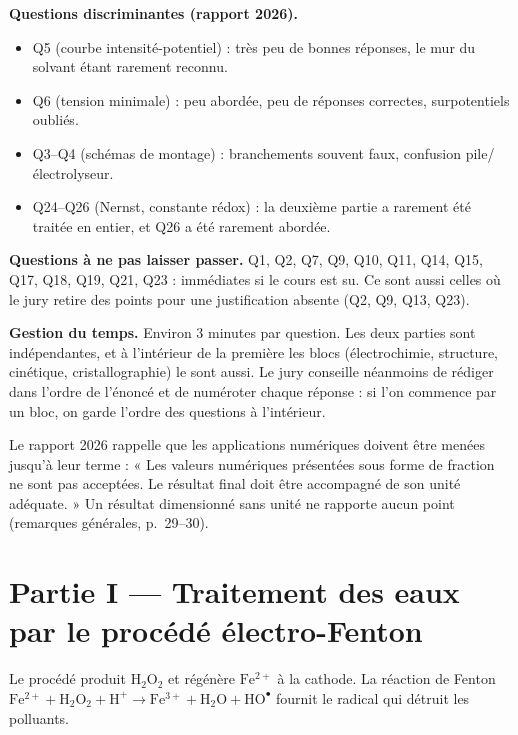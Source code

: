\documentclass[11pt,a4paper]{article}
\providecommand{\tightlist}{\setlength{\itemsep}{0pt}\setlength{\parskip}{0pt}}
\begin{document}
\textbf{Questions discriminantes (rapport 2026).}

\begin{itemize}
\tightlist
\item
  Q5 (courbe intensité-potentiel) : très peu de bonnes réponses, le mur du solvant étant rarement reconnu.
\item
  Q6 (tension minimale) : peu abordée, peu de réponses correctes, surpotentiels oubliés.
\item
  Q3--Q4 (schémas de montage) : branchements souvent faux, confusion pile/électrolyseur.
\item
  Q24--Q26 (Nernst, constante rédox) : la deuxième partie a rarement été traitée en entier, et Q26 a été rarement abordée.
\end{itemize}

\textbf{Questions à ne pas laisser passer.} Q1, Q2, Q7, Q9, Q10, Q11, Q14, Q15, Q17, Q18, Q19, Q21, Q23 : immédiates si le cours est su. Ce sont aussi celles où le jury retire des points pour une justification absente (Q2, Q9, Q13, Q23).

\textbf{Gestion du temps.} Environ 3 minutes par question. Les deux parties sont indépendantes, et à l'intérieur de la première les blocs (électrochimie, structure, cinétique, cristallographie) le sont aussi. Le jury conseille néanmoins de rédiger dans l'ordre de l'énoncé et de numéroter chaque réponse : si l'on commence par un bloc, on garde l'ordre des questions à l'intérieur.

\begin{jury}

Le rapport 2026 rappelle que les applications numériques doivent être menées jusqu'à leur terme : « Les valeurs numériques présentées sous forme de fraction ne sont pas acceptées. Le résultat final doit être accompagné de son unité adéquate. » Un résultat dimensionné sans unité ne rapporte aucun point (remarques générales, p.~29--30).

\end{jury}

\hypertarget{partie-i-traitement-des-eaux-par-le-procuxe9duxe9-uxe9lectro-fenton}{%
\section{Partie I --- Traitement des eaux par le procédé électro-Fenton}\label{partie-i-traitement-des-eaux-par-le-procuxe9duxe9-uxe9lectro-fenton}}

Le procédé produit \(\mathrm{H_2O_2}\) et régénère \(\mathrm{Fe^{2+}}\) à la cathode. La réaction de Fenton \(\mathrm{Fe^{2+}} + \mathrm{H_2O_2} + \mathrm{H^+} \to \mathrm{Fe^{3+}} + \mathrm{H_2O} + \mathrm{HO^\bullet}\) fournit le radical qui détruit les polluants.
\end{document}

